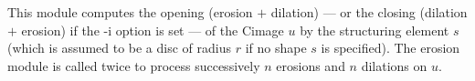 This module computes the opening (erosion $+$ dilation) --- or the closing 
(dilation $+$ erosion) if the -i option is set ---
of the Cimage $u$ by the structuring element $s$ (which is assumed to
be a disc of radius $r$ if no shape $s$ is specified).
The {\sf erosion} module is called twice to process successively
$n$ erosions and $n$ dilations on $u$.

